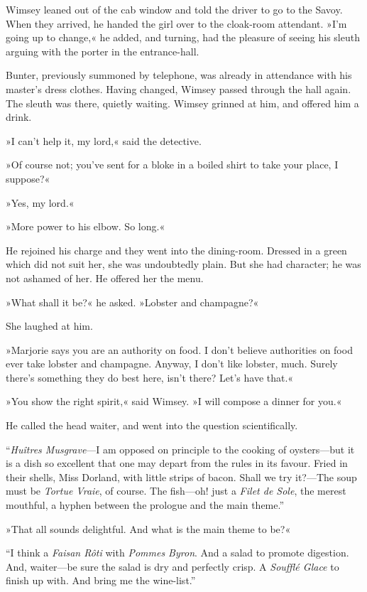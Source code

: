 Wimsey leaned out of the cab window and told the driver to go to the Savoy. When they arrived, he handed the girl over to the cloak-room attendant. »I'm going up to change,« he added, and turning, had the pleasure of seeing his sleuth arguing with the porter in the entrance-hall.

Bunter, previously summoned by telephone, was already in attendance with his master's dress clothes. Having changed, Wimsey passed through the hall again. The sleuth was there, quietly waiting. Wimsey grinned at him, and offered him a drink.

»I can't help it, my lord,« said the detective.

»Of course not; you've sent for a bloke in a boiled shirt to take your place, I suppose?«

»Yes, my lord.«

»More power to his elbow. So long.«

He rejoined his charge and they went into the dining-room. Dressed in a green which did not suit her, she was undoubtedly plain. But she had character; he was not ashamed of her. He offered her the menu.

»What shall it be?« he asked. »Lobster and champagne?«

She laughed at him.

»Marjorie says you are an authority on food. I don't believe authorities on food ever take lobster and champagne. Anyway, I don't like lobster, much. Surely there's something they do best here, isn't there? Let's have that.«

»You show the right spirit,« said Wimsey. »I will compose a dinner for you.«

He called the head waiter, and went into the question scientifically.

\enquote{\textit{Huîtres Musgrave}---I am opposed on principle to the cooking of oysters\allowbreak---\allowbreak but it is a dish so excellent that one may depart from the rules in its favour. Fried in their shells, Miss Dorland, with little strips of bacon. Shall we try it?---The soup must be \textit{Tortue Vraie}, of course. The fish\allowbreak---\allowbreak oh! just a \textit{Filet de Sole}, the merest mouthful, a hyphen between the prologue and the main theme.}

»That all sounds delightful. And what is the main theme to be?«

\enquote{I think a \textit{Faisan Rôti} with \textit{Pommes Byron}. And a salad to promote digestion. And, waiter\allowbreak---\allowbreak be sure the salad is dry and perfectly crisp. A \textit{Soufflé Glace} to finish up with. And bring me the wine-list.}

